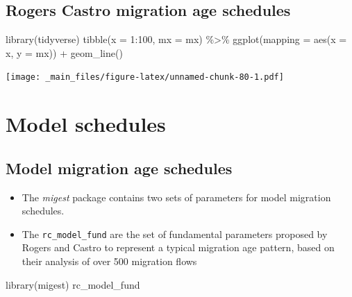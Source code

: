 \documentclass[
]{book}
\newenvironment{Shaded}{\begin{snugshade}}{\end{snugshade}}
\newcommand{\AttributeTok}[1]{\textcolor[rgb]{0.77,0.63,0.00}{#1}}
\newcommand{\DecValTok}[1]{\textcolor[rgb]{0.00,0.00,0.81}{#1}}
\newcommand{\FunctionTok}[1]{\textcolor[rgb]{0.00,0.00,0.00}{#1}}
\newcommand{\NormalTok}[1]{#1}
\newcommand{\SpecialCharTok}[1]{\textcolor[rgb]{0.00,0.00,0.00}{#1}}
\providecommand{\tightlist}{%
  \setlength{\itemsep}{0pt}\setlength{\parskip}{0pt}}
\begin{document}
\hypertarget{rogers-castro-migration-age-schedules-6}{%
\subsection{Rogers Castro migration age schedules}\label{rogers-castro-migration-age-schedules-6}}

\begin{Shaded}
\begin{Highlighting}[]
\FunctionTok{library}\NormalTok{(tidyverse)}
\FunctionTok{tibble}\NormalTok{(}\AttributeTok{x =} \DecValTok{1}\SpecialCharTok{:}\DecValTok{100}\NormalTok{, }
       \AttributeTok{mx =}\NormalTok{ mx) }\SpecialCharTok{\%\textgreater{}\%}
  \FunctionTok{ggplot}\NormalTok{(}\AttributeTok{mapping =} \FunctionTok{aes}\NormalTok{(}\AttributeTok{x =}\NormalTok{ x, }\AttributeTok{y =}\NormalTok{ mx)) }\SpecialCharTok{+}
  \FunctionTok{geom\_line}\NormalTok{()}
\end{Highlighting}
\end{Shaded}

\texttt{[image: \_main\_files/figure-latex/unnamed-chunk-80-1.pdf]}

\hypertarget{model-schedules}{%
\section{Model schedules}\label{model-schedules}}

\hypertarget{model-migration-age-schedules}{%
\subsection{Model migration age schedules}\label{model-migration-age-schedules}}

\begin{itemize}
\tightlist
\item
  The \emph{migest} package contains two sets of parameters for model migration schedules.
\item
  The \texttt{rc\_model\_fund} are the set of fundamental parameters proposed by Rogers and Castro to represent a typical migration age pattern, based on their analysis of over 500 migration flows
\end{itemize}

\begin{Shaded}
\begin{Highlighting}[]
\FunctionTok{library}\NormalTok{(migest)}
\NormalTok{rc\_model\_fund}
\end{Highlighting}
\end{Shaded}
\end{document}
